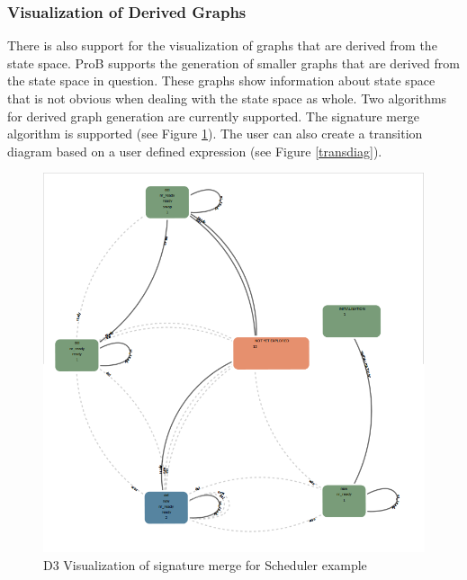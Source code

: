 \subsubsection{Visualization of Derived Graphs}

There is also support for the visualization of graphs that are derived from the state space. ProB supports the generation of smaller graphs that are derived from the state space in question. These graphs show information about state space that is not obvious when dealing with the state space as whole. Two algorithms for derived graph generation are currently supported. The signature merge algorithm is supported (see Figure \ref{sigmerge}). The user can also create a transition diagram based on a user defined expression (see Figure \ref{transdiag}). 

\begin{center}
\begin{figure}[h!]
\includegraphics[width=14cm]{bilder/sigmerge.png}
\caption{D3 Visualization of signature merge for Scheduler example}
\label{sigmerge}
\end{figure}
\end{center}

